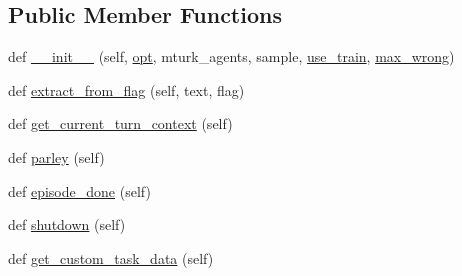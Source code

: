 \subsection*{Public Member Functions}
\begin{DoxyCompactItemize}
\item 
def \hyperlink{classlight__chat__eval_1_1worlds_1_1LightEvalTaskWorld_a9f9e7de884af532dc436e72c8c0011fc}{\+\_\+\+\_\+init\+\_\+\+\_\+} (self, \hyperlink{classparlai_1_1core_1_1worlds_1_1World_a3640d92718acd3e6942a28c1ab3678bd}{opt}, mturk\+\_\+agents, sample, \hyperlink{classlight__chat__eval_1_1worlds_1_1LightEvalTaskWorld_ad605071600d13b139e24541051eb4afb}{use\+\_\+train}, \hyperlink{classlight__chat__eval_1_1worlds_1_1LightEvalTaskWorld_a272355df766ac2722a7547deb5755651}{max\+\_\+wrong})
\item 
def \hyperlink{classlight__chat__eval_1_1worlds_1_1LightEvalTaskWorld_a0530e173b2c53acc0129ff45b628fece}{extract\+\_\+from\+\_\+flag} (self, text, flag)
\item 
def \hyperlink{classlight__chat__eval_1_1worlds_1_1LightEvalTaskWorld_a55840132c24a5cd4147123774ed4dd55}{get\+\_\+current\+\_\+turn\+\_\+context} (self)
\item 
def \hyperlink{classlight__chat__eval_1_1worlds_1_1LightEvalTaskWorld_ae0eca37fa3376ebcd24115d1246dfd81}{parley} (self)
\item 
def \hyperlink{classlight__chat__eval_1_1worlds_1_1LightEvalTaskWorld_a950251a737281924e06c7720c2de9dd8}{episode\+\_\+done} (self)
\item 
def \hyperlink{classlight__chat__eval_1_1worlds_1_1LightEvalTaskWorld_a86acc8c22dd59f854c4a43f34d804975}{shutdown} (self)
\item 
def \hyperlink{classlight__chat__eval_1_1worlds_1_1LightEvalTaskWorld_ad7b6b353e331f0e4eb6a0bc9198a58ee}{get\+\_\+custom\+\_\+task\+\_\+data} (self)
\end{DoxyCompactItemize}
